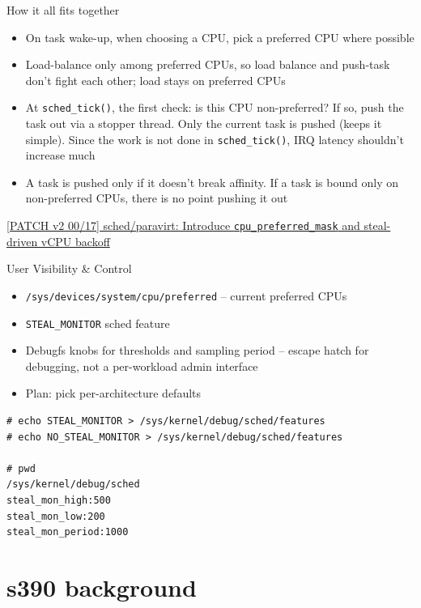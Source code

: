 \documentclass[xetex, table, 10pt,%
aspectratio=169%
]{beamer}
\begin{document}
\begin{frame}{How it all fits together}
\begin{itemize}
  \item On task wake-up, when choosing a CPU, pick a preferred CPU
    where possible
  \item Load-balance only among preferred CPUs, so load balance and
    push-task don't fight each other; load stays on preferred CPUs
  \item At \texttt{sched\_tick()}, the first check: is this CPU
    non-preferred? If so, push the task out via a stopper thread.
    Only the current task is pushed (keeps it simple). Since the
    work is not done in \texttt{sched\_tick()}, IRQ latency shouldn't
    increase much
  \item A task is pushed only if it doesn't break affinity. If a
    task is bound only on non-preferred CPUs, there is no point
    pushing it out
\end{itemize}
\medskip
{\small\href{https://lore.kernel.org/all/20260407191950.643549-1-sshegde@linux.ibm.com/\#r}{[PATCH
v2 00/17] sched/paravirt: Introduce \texttt{cpu\_preferred\_mask} and
steal-driven vCPU backoff}}
\end{frame}

\begin{frame}[fragile]{User Visibility \& Control}
\begin{itemize}
  \item \texttt{/sys/devices/system/cpu/preferred} -- current
    preferred CPUs
  \item \texttt{STEAL\_MONITOR} sched feature
  \item Debugfs knobs for thresholds and sampling period -- escape
    hatch for debugging, not a per-workload admin interface
  \item Plan: pick per-architecture defaults
\end{itemize}
\begin{verbatim}
# echo STEAL_MONITOR > /sys/kernel/debug/sched/features
# echo NO_STEAL_MONITOR > /sys/kernel/debug/sched/features

# pwd
/sys/kernel/debug/sched
steal_mon_high:500
steal_mon_low:200
steal_mon_period:1000
\end{verbatim}
\end{frame}

\section{s390 background}
\end{document}
